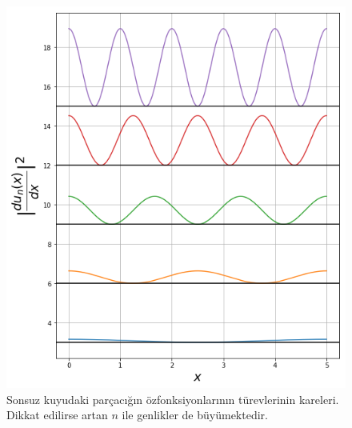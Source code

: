 \documentclass[a4paper,12pt, twoside]{article}
\begin{document}
\begin{enumerate}
\begin{figure}
\begin{minipage}{.48\textwidth}
	\includegraphics[width=\linewidth]{infinite_well_derivative_of_eigenfunctions.png}
	\caption{Sonsuz kuyudaki parçacığın özfonksiyonlarının türevlerinin kareleri. Dikkat edilirse artan $n$ ile genlikler de büyümektedir.}
	\label{fig:infinitewell_derivative_eigenfunctions}
     \end{minipage}
	\end{figure}
	

\end{enumerate}
\end{document}
